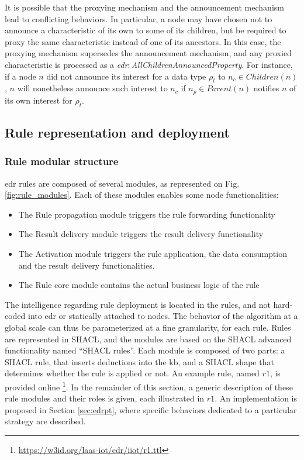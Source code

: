 \documentclass[sw]{iosart2x}
\newcommand{\namespace}[1]{\textit{#1$:$}}
\newcommand{\concept}[2]{\namespace{#1}\-\textit{#2}}
\begin{document}
It is possible that the proxying mechanism and the announcement mechanism lead to conflicting behaviors.
In particular, a node may have chosen not to announce a characteristic of its own to some of its children, but be required to proxy the same characteristic instead of one of its ancestors.
In this case, the proxying mechanism supersedes the announcement mechanism, and any proxied characteristic is processed as a \concept{edr}{All\-Children\-Announced\-Property}.
For instance, if a node $n$ did not announce its interest for a data type $\rho_t$ to $n_{c}\in Children(n)$, $n$ will nonetheless announce such interest to $n_{c}$ if $n_{p}\in Parent(n)$ notifies $n$ of its own interest for $\rho_t$.

\subsection{Rule representation and deployment}
\label{subs:edr_rules}

\subsubsection{Rule modular structure}

\gls{edr} rules are composed of several modules, as represented on Fig. \ref{fig:rule_modules}. 
Each of these modules enables some node functionalities:

\begin{itemize}
	\item The Rule propagation module triggers the rule forwarding functionality
	\item The Result delivery module triggers the result delivery functionality
	\item The Activation module triggers the rule application, the data consumption and the result delivery functionalities.
	\item The Rule core module contains the actual business logic of the rule
\end{itemize}

The intelligence regarding rule deployment is located in the rules, and not hard-coded into \gls{edr} or statically attached to nodes. 
The behavior of the algorithm at a global scale can thus be parameterized at a fine granularity, for each rule.
Rules are represented in SHACL, and the modules are based on the SHACL advanced functionality named ``SHACL rules''.
Each module is composed of two parts: a SHACL rule, that inserts deductions into the \gls{kb}, and a SHACL shape that determines whether the rule is applied or not. 
An example rule, named $r1$, is provided online \footnote{\url{https://w3id.org/laas-iot/edr/iiot/r1.ttl}}.
In the remainder of this section, a generic description of these rule modules and their roles is given, each illustrated in $r1$. 
An implementation is proposed in Section \textsection \ref{sec:edrpt}, where specific behaviors dedicated to a particular strategy are described.
\end{document}
